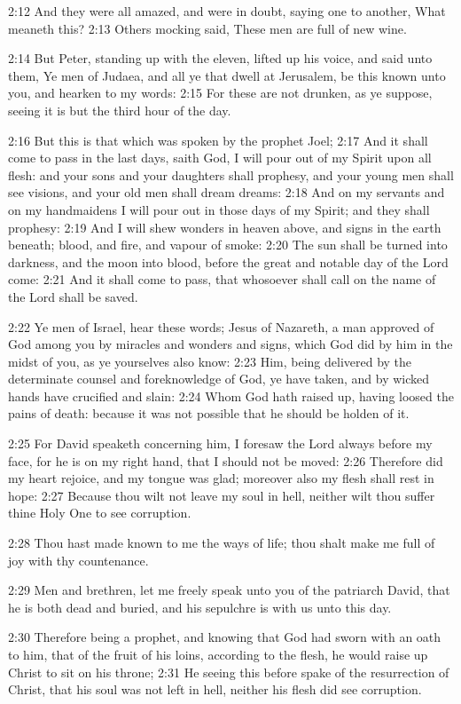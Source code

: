 2:12 And they were all amazed, and were in doubt, saying one to another, What meaneth this?  2:13 Others mocking said, These men are full of new wine.

2:14 But Peter, standing up with the eleven, lifted up his voice, and said unto them, Ye men of Judaea, and all ye that dwell at Jerusalem, be this known unto you, and hearken to my words: 2:15 For these are not drunken, as ye suppose, seeing it is but the third hour of the day.

2:16 But this is that which was spoken by the prophet Joel; 2:17 And it shall come to pass in the last days, saith God, I will pour out of my Spirit upon all flesh: and your sons and your daughters shall prophesy, and your young men shall see visions, and your old men shall dream dreams: 2:18 And on my servants and on my handmaidens I will pour out in those days of my Spirit; and they shall prophesy: 2:19 And I will shew wonders in heaven above, and signs in the earth beneath; blood, and fire, and vapour of smoke: 2:20 The sun shall be turned into darkness, and the moon into blood, before the great and notable day of the Lord come: 2:21 And it shall come to pass, that whosoever shall call on the name of the Lord shall be saved.

2:22 Ye men of Israel, hear these words; Jesus of Nazareth, a man approved of God among you by miracles and wonders and signs, which God did by him in the midst of you, as ye yourselves also know: 2:23 Him, being delivered by the determinate counsel and foreknowledge of God, ye have taken, and by wicked hands have crucified and slain: 2:24 Whom God hath raised up, having loosed the pains of death: because it was not possible that he should be holden of it.

2:25 For David speaketh concerning him, I foresaw the Lord always before my face, for he is on my right hand, that I should not be moved: 2:26 Therefore did my heart rejoice, and my tongue was glad; moreover also my flesh shall rest in hope: 2:27 Because thou wilt not leave my soul in hell, neither wilt thou suffer thine Holy One to see corruption.

2:28 Thou hast made known to me the ways of life; thou shalt make me full of joy with thy countenance.

2:29 Men and brethren, let me freely speak unto you of the patriarch David, that he is both dead and buried, and his sepulchre is with us unto this day.

2:30 Therefore being a prophet, and knowing that God had sworn with an oath to him, that of the fruit of his loins, according to the flesh, he would raise up Christ to sit on his throne; 2:31 He seeing this before spake of the resurrection of Christ, that his soul was not left in hell, neither his flesh did see corruption.

